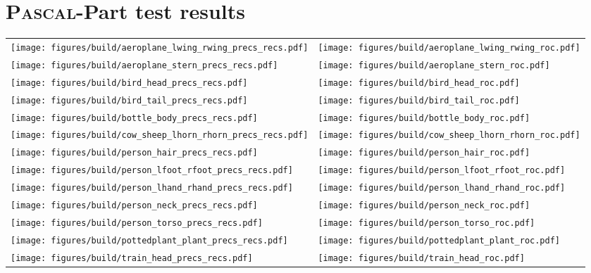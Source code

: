 \clearpage
\section{\textsc{Pascal}-Part test results}
\label{sec:appendix:pr_roc}
\begin{longtabu} to \textwidth {XX}
    \texttt{[image: figures/build/aeroplane\_lwing\_rwing\_precs\_recs.pdf]} &
    \texttt{[image: figures/build/aeroplane\_lwing\_rwing\_roc.pdf]} \\
    \texttt{[image: figures/build/aeroplane\_stern\_precs\_recs.pdf]} &
    \texttt{[image: figures/build/aeroplane\_stern\_roc.pdf]} \\
    \texttt{[image: figures/build/bird\_head\_precs\_recs.pdf]} &
    \texttt{[image: figures/build/bird\_head\_roc.pdf]} \\
    \texttt{[image: figures/build/bird\_tail\_precs\_recs.pdf]} &
    \texttt{[image: figures/build/bird\_tail\_roc.pdf]} \\
    \texttt{[image: figures/build/bottle\_body\_precs\_recs.pdf]} &
    \texttt{[image: figures/build/bottle\_body\_roc.pdf]} \\
    \texttt{[image: figures/build/cow\_sheep\_lhorn\_rhorn\_precs\_recs.pdf]} &
    \texttt{[image: figures/build/cow\_sheep\_lhorn\_rhorn\_roc.pdf]} \\
    \texttt{[image: figures/build/person\_hair\_precs\_recs.pdf]} &
    \texttt{[image: figures/build/person\_hair\_roc.pdf]} \\
    \texttt{[image: figures/build/person\_lfoot\_rfoot\_precs\_recs.pdf]} &
    \texttt{[image: figures/build/person\_lfoot\_rfoot\_roc.pdf]} \\
    \texttt{[image: figures/build/person\_lhand\_rhand\_precs\_recs.pdf]} &
    \texttt{[image: figures/build/person\_lhand\_rhand\_roc.pdf]} \\
    \texttt{[image: figures/build/person\_neck\_precs\_recs.pdf]} &
    \texttt{[image: figures/build/person\_neck\_roc.pdf]} \\
    \texttt{[image: figures/build/person\_torso\_precs\_recs.pdf]} &
    \texttt{[image: figures/build/person\_torso\_roc.pdf]} \\
    \texttt{[image: figures/build/pottedplant\_plant\_precs\_recs.pdf]} &
    \texttt{[image: figures/build/pottedplant\_plant\_roc.pdf]} \\
    \texttt{[image: figures/build/train\_head\_precs\_recs.pdf]} &
    \texttt{[image: figures/build/train\_head\_roc.pdf]}
	\label{tab:combos}
\end{longtabu}
